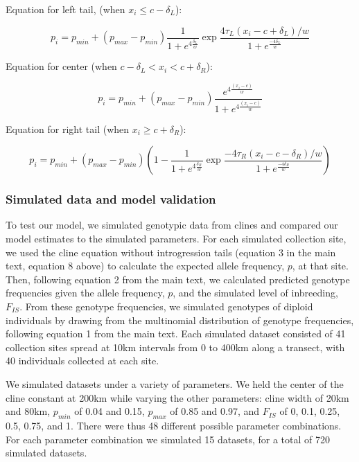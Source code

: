 \documentclass[]{article}
\begin{document}
Equation for left tail, (when \(x_{i} \leq c - \delta_{L}\)):

\begin{equation}
\label{eq:lefttail}
p_{i} =  p_{min} + (p_{max} - p_{min})\frac{1}{1 + e^{{4\frac{\delta_{L}}{w}}}}\exp{\frac{4\tau_{L}(x_{i}-c+\delta_{L})/w}{1 + e^{\frac{-4\delta_{L}}{w}}}}
\end{equation}

Equation for center (when \(c - \delta_{L} < x_{i} < c + \delta_{R}\)):

\begin{equation}
\label{eq:clineCenter}
p_{i} = p_{min} + (p_{max} - p_{min})\frac{e^{4\frac{(x_{i}-c)}{w}}}{1 + e^{4\frac{(x_{i}-c)}{w}}}
\end{equation}

Equation for right tail (when \(x_{i} \geq c + \delta_{R}\)):

\begin{equation}
\label{eq:righttail}
p_{i} =  p_{min} + (p_{max} - p_{min})\left(1-\frac{1}{1 + e^{{4\frac{\delta_{R}}{w}}}}\exp{\frac{-4\tau_{R}(x_{i}-c-\delta_{R})/w}{1 + e^{\frac{-4\delta_{R}}{w}}}}\right) 
\end{equation}

\subsubsection{Simulated data and model
validation}\label{simulated-data-and-model-validation}

To test our model, we simulated genotypic data from clines and compared
our model estimates to the simulated parameters. For each simulated
collection site, we used the cline equation without introgression tails
(equation 3 in the main text, equation 8 above) to calculate the
expected allele frequency, \(p\), at that site. Then, following equation
2 from the main text, we calculated predicted genotype frequencies given
the allele frequency, \(p\), and the simulated level of inbreeding,
\(F_{IS}\). From these genotype frequencies, we simulated genotypes of
diploid individuals by drawing from the multinomial distribution of
genotype frequencies, following equation 1 from the main text. Each
simulated dataset consisted of 41 collection sites spread at 10km
intervals from 0 to 400km along a transect, with 40 individuals
collected at each site.

We simulated datasets under a variety of parameters. We held the center
of the cline constant at 200km while varying the other parameters: cline
width of 20km and 80km, \(p_{min}\) of 0.04 and 0.15, \(p_{max}\) of
0.85 and 0.97, and \(F_{IS}\) of 0, 0.1, 0.25, 0.5, 0.75, and 1. There
were thus 48 different possible parameter combinations. For each
parameter combination we simulated 15 datasets, for a total of 720
simulated datasets.
\end{document}
